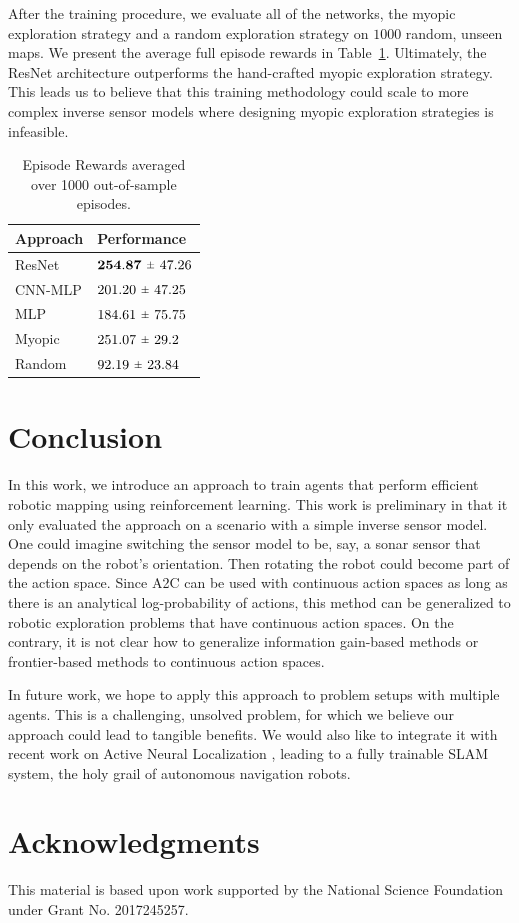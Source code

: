 \documentclass{article}
\newcommand{\rpm}{\raisebox{.2ex}{$\scriptstyle\pm$}}
\begin{document}
After the training procedure, we evaluate all of the networks, the myopic exploration strategy and a random exploration strategy on $1000$ random, unseen maps. We present the average full episode rewards in Table~\ref{tab:results}. Ultimately, the ResNet architecture outperforms the hand-crafted myopic exploration strategy. This leads us to believe that this training methodology could scale to more complex inverse sensor models where designing myopic exploration strategies is infeasible.

\begin{table}[H]
  \caption{Episode Rewards averaged over 1000 out-of-sample episodes.}
  \label{tab:results}
  \centering
  \begin{tabular}{ll}
    \toprule
    Approach & Performance \\
    \midrule
    ResNet   & $\mathbf{254.87} \ \rpm \ 47.26$  \\
    CNN-MLP  & $201.20 \ \rpm \ 47.25$ \\
    MLP      & $184.61 \ \rpm \ 75.75$ \\
    Myopic   & $251.07 \ \rpm \ 29.2$ \\
    Random   & $92.19 \ \rpm \ 23.84$ \\
    \bottomrule
  \end{tabular}
\end{table}

\section{Conclusion}

In this work, we introduce an approach to train agents that perform efficient robotic mapping using reinforcement learning. This work is preliminary in that it only evaluated the approach on a scenario with a simple inverse sensor model. One could imagine switching the sensor model to be, say, a sonar sensor that depends on the robot's orientation. Then rotating the robot could become part of the action space. Since A2C can be used with continuous action spaces as long as there is an analytical log-probability of actions, this method can be generalized to robotic exploration problems that have continuous action spaces. On the contrary, it is not clear how to generalize information gain-based methods or frontier-based methods to continuous action spaces.

In future work, we hope to apply this approach to problem setups with multiple agents. This is a challenging, unsolved problem, for which we believe our approach could lead to tangible benefits. We would also like to integrate it with recent work on Active Neural Localization \cite{nal}, leading to a fully trainable SLAM system, the holy grail of autonomous navigation robots.

\section*{Acknowledgments}

This material is based upon work supported by the National Science Foundation under Grant No. 2017245257.

{}


\appendix
\end{document}

